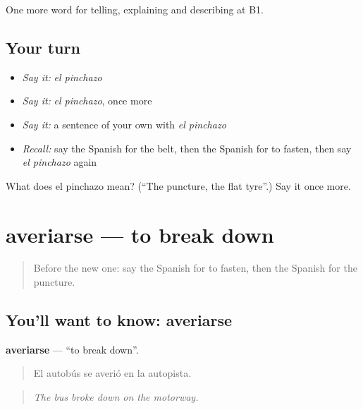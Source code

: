 \begin{grammarlens}[title={What you've built}]
One more word for telling, explaining and describing at B1.
\end{grammarlens}

\subsection*{Your turn}
\begin{itemize}
\raggedright
  \item \emph{Say it:} \emph{el pinchazo}
  \item \emph{Say it:} \emph{el pinchazo}, once more
  \item \emph{Say it:} a sentence of your own with \emph{el pinchazo}
  \item \emph{Recall:} say the Spanish for the belt, then the Spanish for to fasten, then say \emph{el pinchazo} again
\end{itemize}

\begin{tcolorbox}[breakable,colback=teal!4,colframe=teal!35!black,title={Before you move on}]
What does el pinchazo mean? (\textquotedblleft{}The puncture, the flat tyre\textquotedblright{}.) Say it once more.
\end{tcolorbox}
\section[averiarse]{averiarse — to break down}

\label{lesson:ES-C645-averiarse}



\begin{quote}
Before the new one: say the Spanish for to fasten, then the Spanish for the puncture.
\end{quote}

\subsection*{You'll want to know: averiarse}
\textbf{averiarse} — \textquotedblleft{}to break down\textquotedblright{}.

\begin{quote}
El autobús se averió en la autopista.
\end{quote}

\begin{quote}
\emph{The bus broke down on the motorway.}
\end{quote}


